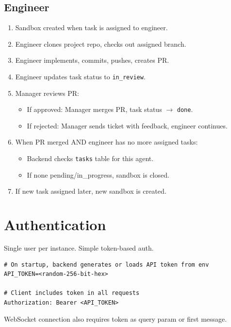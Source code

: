 \documentclass[11pt,a4paper]{article}
\begin{document}
\subsection{Engineer}

\begin{enumerate}
  \item Sandbox created when task is assigned to engineer.
  \item Engineer clones project repo, checks out assigned branch.
  \item Engineer implements, commits, pushes, creates PR.
  \item Engineer updates task status to \texttt{in\_review}.
  \item Manager reviews PR:
    \begin{itemize}
      \item If approved: Manager merges PR, task status $\to$ \texttt{done}.
      \item If rejected: Manager sends ticket with feedback, engineer continues.
    \end{itemize}
  \item When PR merged AND engineer has no more assigned tasks:
    \begin{itemize}
      \item Backend checks \texttt{tasks} table for this agent.
      \item If none pending/in\_progress, sandbox is closed.
    \end{itemize}
  \item If new task assigned later, new sandbox is created.
\end{enumerate}

\section{Authentication}

Single user per instance. Simple token-based auth.

\begin{lstlisting}
# On startup, backend generates or loads API token from env
API_TOKEN=<random-256-bit-hex>

# Client includes token in all requests
Authorization: Bearer <API_TOKEN>
\end{lstlisting}

WebSocket connection also requires token as query param or first message.
\end{document}
